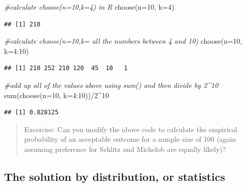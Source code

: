 \documentclass[
  openany]{book}
\newenvironment{Shaded}{\begin{snugshade}}{\end{snugshade}}
\newcommand{\AttributeTok}[1]{\textcolor[rgb]{0.77,0.63,0.00}{#1}}
\newcommand{\CommentTok}[1]{\textcolor[rgb]{0.56,0.35,0.01}{\textit{#1}}}
\newcommand{\DecValTok}[1]{\textcolor[rgb]{0.00,0.00,0.81}{#1}}
\newcommand{\FunctionTok}[1]{\textcolor[rgb]{0.00,0.00,0.00}{#1}}
\newcommand{\NormalTok}[1]{#1}
\newcommand{\SpecialCharTok}[1]{\textcolor[rgb]{0.00,0.00,0.00}{#1}}
\begin{document}
\begin{Shaded}
\begin{Highlighting}[]
\CommentTok{\#calculate choose(n=10,k=4) in R}
\FunctionTok{choose}\NormalTok{(}\AttributeTok{n=}\DecValTok{10}\NormalTok{, }\AttributeTok{k=}\DecValTok{4}\NormalTok{)}
\end{Highlighting}
\end{Shaded}

\begin{verbatim}
## [1] 210
\end{verbatim}

\begin{Shaded}
\begin{Highlighting}[]
\CommentTok{\#calculate choose(n=10,k= all the numbers between 4 and 10)}
\FunctionTok{choose}\NormalTok{(}\AttributeTok{n=}\DecValTok{10}\NormalTok{, }\AttributeTok{k=}\DecValTok{4}\SpecialCharTok{:}\DecValTok{10}\NormalTok{)}
\end{Highlighting}
\end{Shaded}

\begin{verbatim}
## [1] 210 252 210 120  45  10   1
\end{verbatim}

\begin{Shaded}
\begin{Highlighting}[]
\CommentTok{\#add up all of the values above using sum() and then divide by 2\^{}10}
\FunctionTok{sum}\NormalTok{(}\FunctionTok{choose}\NormalTok{(}\AttributeTok{n=}\DecValTok{10}\NormalTok{, }\AttributeTok{k=}\DecValTok{4}\SpecialCharTok{:}\DecValTok{10}\NormalTok{))}\SpecialCharTok{/}\DecValTok{2}\SpecialCharTok{\^{}}\DecValTok{10}
\end{Highlighting}
\end{Shaded}

\begin{verbatim}
## [1] 0.828125
\end{verbatim}

\begin{quote}
Excercise: Can you modify the above code to calculate the empirical probability of an acceptable outcome for a sample size of 100 (again assuming preference for Schlitz and Michelob are equally likely)?
\end{quote}

\hypertarget{the-solution-by-distribution-or-statistics}{%
\subsection*{The solution by distribution, or statistics}\label{the-solution-by-distribution-or-statistics}}
\end{document}
